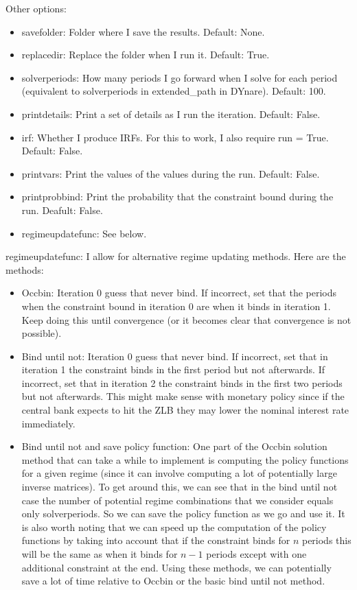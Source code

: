 \documentclass{article}
\theoremstyle{definition}
\begin{document}
Other options:
\begin{itemize}
    \item savefolder: Folder where I save the results. Default: None.
    \item replacedir: Replace the folder when I run it. Default: True.
    \item solverperiods: How many periods I go forward when I solve for each period (equivalent to solverperiods in extended\_path in DYnare). Default: 100.
    \item printdetails: Print a set of details as I run the iteration. Default: False.
    \item irf: Whether I produce IRFs. For this to work, I also require run = True. Default: False.
    \item printvars: Print the values of the values during the run. Default: False.
    \item printprobbind: Print the probability that the constraint bound during the run. Deafult: False.
    \item regimeupdatefunc: See below.
\end{itemize}

regimeupdatefunc: I allow for alternative regime updating methods. Here are the methods:
\begin{itemize}
    \item Occbin: Iteration 0 guess that never bind. If incorrect, set that the periods when the constraint bound in iteration 0 are when it binds in iteration 1. Keep doing this until convergence (or it becomes clear that convergence is not possible).
    \item Bind until not: Iteration 0 guess that never bind. If incorrect, set that in iteration 1 the constraint binds in the first period but not afterwards. If incorrect, set that in iteration 2 the constraint binds in the first two periods but not afterwards. This might make sense with monetary policy since if the central bank expects to hit the ZLB they may lower the nominal interest rate immediately.
    \item Bind until not and save policy function: One part of the Occbin solution method that can take a while to implement is computing the policy functions for a given regime (since it can involve computing a lot of potentially large inverse matrices). To get around this, we can see that in the bind until not case the number of potential regime combinations that we consider equals only solverperiods. So we can save the policy function as we go and use it. It is also worth noting that we can speed up the computation of the policy functions by taking into account that if the constraint binds for $n$ periods this will be the same as when it binds for $n - 1$ periods except with one additional constraint at the end. Using these methods, we can potentially save a lot of time relative to Occbin or the basic bind until not method.
\end{itemize}
\end{document}
